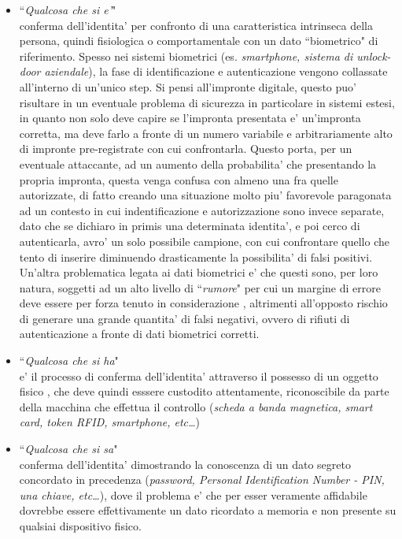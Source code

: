 \begin{itemize}
	\item ``\emph{Qualcosa che si e'}" \\
		conferma dell'identita' per confronto di una caratteristica intrinseca della persona, quindi fisiologica o comportamentale con un dato ``biometrico" di riferimento. Spesso nei sistemi biometrici (es. \emph{smartphone, sistema di unlock-door aziendale}), la fase di identificazione e autenticazione vengono collassate all'interno di un'unico step. Si pensi all'impronte digitale, questo puo' risultare in un eventuale problema di sicurezza in particolare in sistemi estesi, in quanto non solo deve capire se l'impronta presentata e' un'impronta corretta, ma deve farlo a fronte di un numero variabile e arbitrariamente alto di impronte pre-registrate con cui confrontarla. Questo porta, per un eventuale attaccante, ad un aumento della probabilita' che presentando la propria impronta, questa venga confusa con almeno una fra quelle autorizzate, di fatto creando una situazione molto piu' favorevole paragonata ad un contesto in cui indentificazione e autorizzazione sono invece separate, dato che se dichiaro in primis una determinata identita', e poi cerco di autenticarla, avro' un solo possibile campione, con cui confrontare quello che tento di inserire diminuendo drasticamente la possibilita' di falsi positivi. Un'altra problematica legata ai dati biometrici e' che questi sono, per loro natura, soggetti ad un alto livello di ``\emph{rumore}" per cui un margine di errore deve essere per forza tenuto in considerazione , altrimenti all'opposto rischio di generare una grande quantita' di falsi negativi, ovvero di rifiuti di autenticazione a fronte di dati biometrici corretti.

	\item ``\emph{Qualcosa che si ha}"\\
		e' il processo di conferma dell'identita' attraverso il possesso di un oggetto fisico , che deve quindi esssere custodito attentamente, riconoscibile da parte della macchina che effettua il controllo (\emph{scheda a banda magnetica, smart card, token RFID, smartphone, etc\dots})

	\item ``\emph{Qualcosa che si sa}"\\
		conferma dell'identita' dimostrando la conoscenza di un dato segreto concordato in precedenza (\emph{password, Personal Identification Number - PIN, una chiave, etc\dots}), dove il problema e' che per esser veramente affidabile dovrebbe essere effettivamente un dato ricordato a memoria e non presente su qualsiai dispositivo fisico.
\end{itemize}

